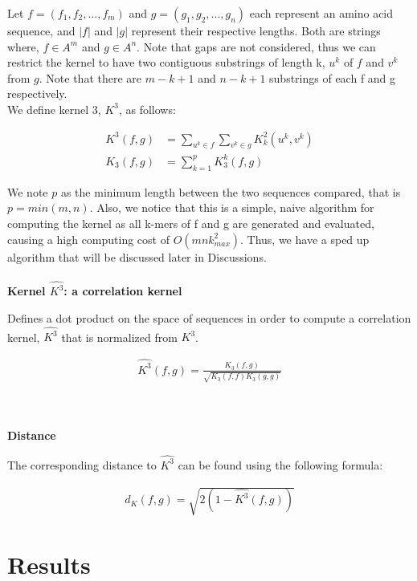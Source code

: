 \documentclass{article}
\begin{document}
Let $f = (f_1, f_2,...,f_m)$ and $g = (g_1, g_2,...,g_n)$ each represent an amino acid sequence, and $|f|$ and  $|g|$ represent their respective lengths. Both are strings where, $f \in A^m$ and $g \in A^n$. Note that gaps are not considered, thus we can restrict the kernel to have two contiguous substrings of length k, $u^k$ of $f$ and $v^k$ from $g$. Note that there are $m - k+1$ and $n-k+1$ substrings of each f and g respectively. \\
We define kernel 3, $K^3$, as follows: 
\begin{center}
\begin{align*} 
K^3(f,g) &= \sum_{u^k \in f}\sum_{v^k \in g} K^2_k(u^k,v^k) \\
K_3(f,g) &= \sum_{k=1}^p K_3^k(f,g)
\end{align*}
\end{center}
We note $p$ as the minimum length between the two sequences compared, that is $p = min(m,n)$. Also, we notice that this is a simple, naive algorithm for computing the kernel as all k-mers of f and g are generated and evaluated, causing a high computing cost of $O(mnk^2_{max})$. Thus, we have a sped up algorithm that will be discussed later in Discussions.
\\\\
\textbf{Kernel $\hat{K^3}$: a correlation kernel}

Defines a dot product on the space of sequences in order to compute a correlation kernel, $\hat{K^3}$ that is normalized from $K^3$. 
\begin{center}
\begin{align*} 
\hat{K^3}(f,g) = \frac{K_3(f,g)}{\sqrt{K_3(f,f)K_3(g,g)}}
\end{align*}
\end{center}
\\\\
\textbf{Distance}

The corresponding distance to $\hat{K^3}$ can be found using the following formula:
\begin{center}
\begin{align*} 
    d_{K}(f,g) = \sqrt{2(1-\hat{K^3}(f,g))}
    \end{align*}
\end{center}

\section{Results}
\end{document}

